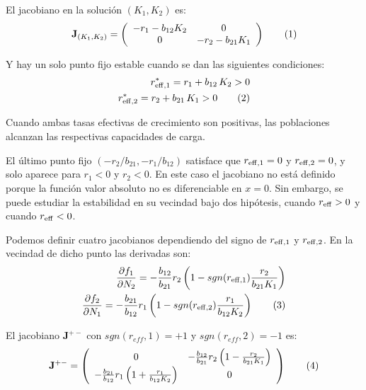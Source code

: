 El jacobiano en la solución $(K_1,K_2)$ es: 
\begin{equation}
\mathbf{J}_{\left(K_1,K_2\right)}= \left(
  \begin{array}{cc}
    -r_1-b_{12}K_2 & 0\\
    0 & -r_2-b_{21}K_1
    \end{array} \right)
\stepcounter{equation}\tag{\theequation}\label{eq:JacobK1K2}
\end{equation}

Y hay un solo punto fijo estable cuando se dan las siguientes condiciones:
\begin{align*}
\displaystyle r^{\ast}_{\rm{eff},1} = r_{1} + b_{12}\, K_2 > 0 \\
\displaystyle r^{\ast}_{\rm{eff},2} = r_{2} + b_{21}\, K_1 > 0
\stepcounter{equation}\tag{\theequation}\label{eq:conditio2}
\end{align*}

Cuando ambas tasas efectivas de crecimiento son positivas, las poblaciones alcanzan las respectivas capacidades de carga.

El último punto fijo $({-r_{2}}/{b_{21}}, {-r_{1}}/{b_{12}})$ satisface que $r_{\rm{eff},1}=0$ y $r_{\rm{eff},2}=0$, y solo aparece para $r_{1}<0$ y $r_{2}<0$. En este caso el jacobiano no está definido porque la función valor absoluto no es diferenciable en $x=0$. Sin embargo, se puede estudiar la estabilidad en su vecindad bajo dos hipótesis, cuando $r_{\rm{eff}}>0$ y cuando $r_{\rm{eff}}<0$.

Podemos definir cuatro jacobianos dependiendo del signo de $r_{\rm{eff},1}$ y $r_{\rm{eff},2}$. En la vecindad de dicho punto las derivadas son:
\begin{align*}
\displaystyle \frac{\partial f_1}{\partial N_2} = -\frac{b_{12}}{b_{21}}r_2\left(1-sgn(r_{\rm{eff},1})\frac{r_2}{b_{21}K_1} \right)\\
\displaystyle \frac{\partial f_2}{\partial N_1} = -\frac{b_{21}}{b_{12}}r_1\left(1-sgn(r_{\rm{eff},2})\frac{r_1}{b_{12}K_2} \right)
\stepcounter{equation}\tag{\theequation}\label{eq:deriv_reff_0}
\end{align*}

El jacobiano $\mathbf{J}^{+-}$ con $sgn(r_{eff},1)=+1$ y $sgn(r_{eff},2)=-1$ es:
\begin{equation}
\mathbf{J}^{+-}= \left(
  \begin{array}{cc}
    0 & -\frac{b_{12}}{b_{21}}r_2\left(1-\frac{r_2}{b_{21}K_1} \right)\\
    -\frac{b_{21}}{b_{12}}r_1\left(1+\frac{r_1}{b_{12}K_2} \right)  & 0
    \end{array} \right)
\stepcounter{equation}\tag{\theequation}\label{eq:Jacob+-}
\vspace*{5mm}
\end{equation}

